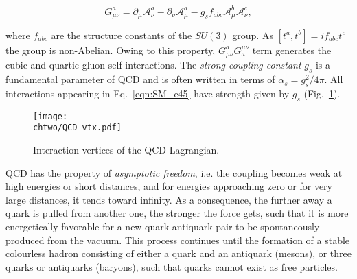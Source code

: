 \begin{equation}\label{eqn:SM_e47}
G^a_{\mu\nu} = \partial_\mu\mathcal{A}^a_\nu - \partial_\nu\mathcal{A}^a_\mu - g_s f_{abc}\mathcal{A}^b_\mu\mathcal{A}^c_\nu,
\end{equation}

\noindent where $f_{abc}$ are the structure constants of the $SU(3)$ group.
As $[t^a,t^b] = if_{abc}t^c$ the group is non-Abelian. Owing to this property, $G^a_{\mu\nu}G^{\mu\nu}_a$ term generates the cubic and quartic gluon self-interactions.
The \textit{strong coupling constant} $g_s$ is a fundamental parameter of QCD and is often written in terms of $\alpha_s = g_s^2/4\pi$.
All interactions appearing in Eq.~\ref{eqn:SM_e45} have strength given by $g_s$ (Fig.~\ref{fig:QCDVtx}).\\

\begin{figure}[!htb]
\centering
\texttt{[image: \\chtwo/QCD\_vtx.pdf]}
\caption{Interaction vertices of the QCD Lagrangian.}
\label{fig:QCDVtx}
\end{figure}

QCD has the property of \textit{asymptotic freedom}, i.e. the coupling becomes weak at high energies or short distances, and for energies approaching zero or for very large distances, it tends toward infinity.
As a consequence, the further away a quark is pulled from another one, the stronger the force gets, such that it is more energetically favorable for a new quark-antiquark pair to be spontaneously produced from the vacuum.
This process continues until the formation of a stable colourless hadron consisting of either a quark and an antiquark (mesons), or three quarks or antiquarks (baryons), such that quarks cannot exist as free particles.


